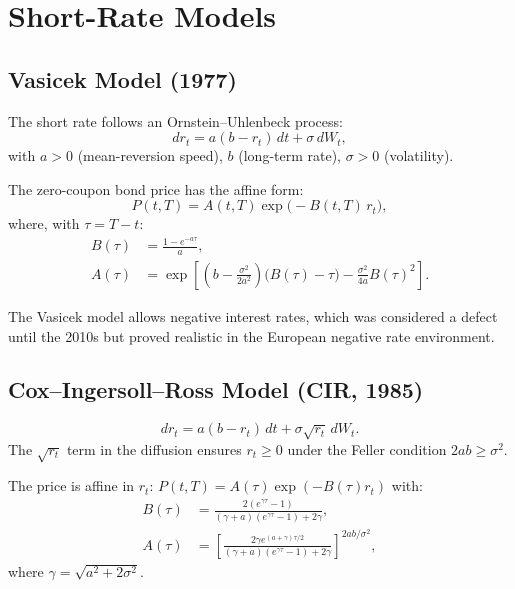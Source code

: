 \section{Short-Rate Models}

\subsection{Vasicek Model (1977)}

\begin{definition}
The short rate follows an Ornstein--Uhlenbeck process:
\[
    dr_t = a(b - r_t)\,dt + \sigma\,dW_t,
\]
with $a > 0$ (mean-reversion speed), $b$ (long-term rate),
$\sigma > 0$ (volatility).
\end{definition}

\begin{theorem}
\label{thm:vasicek_zc}
The zero-coupon bond price has the affine form:
\[
    P(t,T) = A(t,T)\exp\!\bigl(-B(t,T)\,r_t\bigr),
\]
where, with $\tau = T - t$:
\begin{align}
    B(\tau) &= \frac{1 - e^{-a\tau}}{a}, \\
    A(\tau) &= \exp\!\left[\left(b - \frac{\sigma^2}{2a^2}\right)
    \bigl(B(\tau) - \tau\bigr) - \frac{\sigma^2}{4a}B(\tau)^2\right].
\end{align}
\end{theorem}

\begin{remark}
The Vasicek model allows negative interest rates, which was considered a
defect until the 2010s but proved realistic in the European negative rate
environment.
\end{remark}

\subsection{Cox--Ingersoll--Ross Model (CIR, 1985)}

\begin{definition}
\[
    dr_t = a(b - r_t)\,dt + \sigma\sqrt{r_t}\,dW_t.
\]
The $\sqrt{r_t}$ term in the diffusion ensures $r_t \geq 0$ under the
Feller condition $2ab \geq \sigma^2$.
\end{definition}

\begin{theorem}
The price is affine in $r_t$:
$P(t,T) = A(\tau)\exp(-B(\tau)r_t)$ with:
\begin{align}
    B(\tau) &= \frac{2(e^{\gamma\tau} - 1)}
    {(\gamma + a)(e^{\gamma\tau} - 1) + 2\gamma}, \\
    A(\tau) &= \left[\frac{2\gamma e^{(a+\gamma)\tau/2}}
    {(\gamma+a)(e^{\gamma\tau}-1) + 2\gamma}\right]^{2ab/\sigma^2},
\end{align}
where $\gamma = \sqrt{a^2 + 2\sigma^2}$.
\end{theorem}

